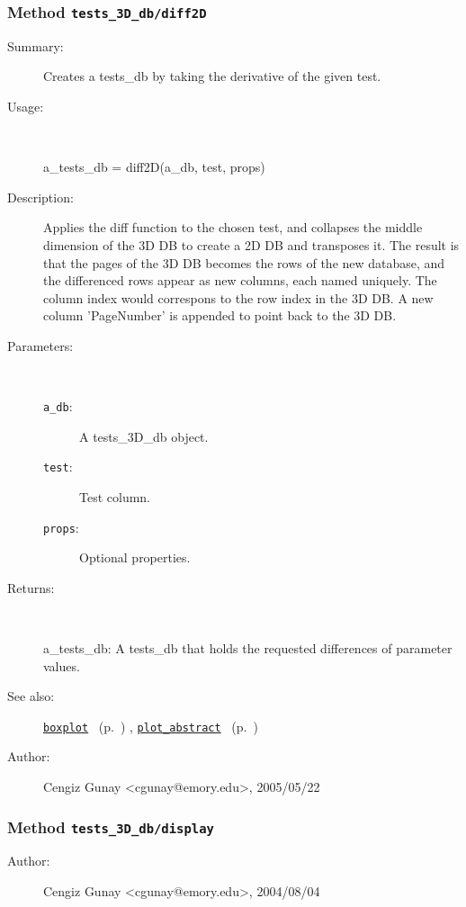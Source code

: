 \subsubsection[Method \texttt{diff2D}]{Method \texttt{tests\_3D\_db/diff2D}}%
%
\label{ref_tests_3D_db__diff2D}%
\hypertarget{ref_tests_3D_db__diff2D}{}%
\begin{description}
\item[Summary:]Creates a tests\_db by taking the derivative of the given test.
%
\item[Usage:]~%
\begin{lyxcode}%
a\_tests\_db = diff2D(a\_db, test, props)
%
\end{lyxcode}%
%
\item[Description:]%
Applies the diff function to the chosen test, and collapses the middle
 dimension of the 3D DB to create a 2D DB and transposes it. The result is
 that the pages of the 3D DB becomes the rows of the new database, and the
 differenced rows appear as new columns, each named uniquely. The column
 index would correspons to the row index in the 3D DB. A new column
 'PageNumber' is appended to point back to the 3D DB.
\item[Parameters:]~
\begin{description}%
\item[\texttt{a\_db}:]
 A tests\_3D\_db object.
\item[\texttt{test}:]
 Test column.
\item[\texttt{props}:]
 Optional properties.
\end{description}%
%
\item[Returns:
]~

	a\_tests\_db: A tests\_db that holds the requested differences of parameter values.
%
%
\item[See also:]%
\hyperlink{ref_boxplot}{\texttt{boxplot}}%
\ (p.~\pageref{ref_boxplot})%
%
, \hyperlink{ref_plot_abstract}{\texttt{plot\_abstract}}%
\ (p.~\pageref{ref_plot_abstract})%
%
%
\item[Author:]%
Cengiz Gunay <cgunay@emory.edu>, 2005/05/22
%
\end{description}
\methodline%
\subsubsection[Method \texttt{display}]{Method \texttt{tests\_3D\_db/display}}%
%
\label{ref_tests_3D_db__display}%
\hypertarget{ref_tests_3D_db__display}{}%
\begin{description}
%
%
%
%
%
%
%
\item[Author:]%
Cengiz Gunay <cgunay@emory.edu>, 2004/08/04
%
\end{description}
\methodline%
